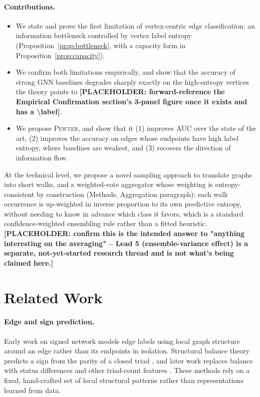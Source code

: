 \documentclass[letterpaper]{article} %
\newcommand{\method}{\textsc{Pewter}\xspace}
\newcommand{\ph}[1]{\textbf{[#1]}}  %
\theoremstyle{plain}
\theoremstyle{definition}
\begin{document}
\paragraph{Contributions.}
\begin{itemize}
\item We state and prove the first limitation of vertex-centric edge classification: an information bottleneck controlled by vertex label entropy (Proposition~\ref{prop:bottleneck}, with a capacity form in Proposition~\ref{prop:capacity}).
\item We confirm both limitations empirically, and show that the accuracy of strong GNN baselines degrades sharply exactly on the high-entropy vertices the theory points to \ph{PLACEHOLDER: forward-reference the Empirical Confirmation section's 3-panel figure once it exists and has a \textbackslash label}.
\item We propose \method, and show that it (1) improves AUC over the state of the art, (2) improves the accuracy on edges whose endpoints have high label entropy, where baselines are weakest, and (3) recovers the direction of information flow.
\end{itemize}
At the technical level, we propose a novel sampling approach to translate graphs into short walks, and a weighted-vote aggregator whose weighting is entropy-consistent by construction (Methods, Aggregation paragraph): each walk occurrence is up-weighted in inverse proportion to its own predictive entropy, without needing to know in advance which class it favors, which is a standard confidence-weighted ensembling rule rather than a fitted heuristic. \ph{PLACEHOLDER: confirm this is the intended answer to "anything interesting on the averaging" -- Lead 5 (ensemble-variance effect) is a separate, not-yet-started research thread and is not what's being claimed here.}

\section{Related Work}
\paragraph{Edge and sign prediction.} Early work on signed network models edge labels using local graph structure around an edge rather than its endpoints in isolation. Structural balance theory predicts a sign from the parity of a closed triad \citep{PLACEHOLDER: Heider balance theory / Cartwright-Harary structural balance}, and later work replaces balance with status differences and other triad-count features \citep{PLACEHOLDER: Leskovec, Huttenlocher, Kleinberg -- signed network sign prediction / status theory}. These methods rely on a fixed, hand-crafted set of local structural patterns rather than representations learned from data.
\end{document}
